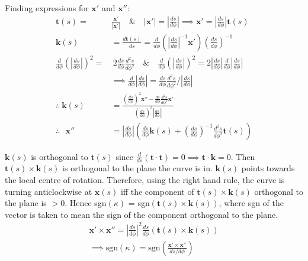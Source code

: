 \documentclass[12pt, a4paper]{article}
\begin{document}
Finding expressions for $\bm{x'}$ and $\bm{x''}$:
\begin{align}
	\bm{t}(s) = & \frac{\bm{x'}}{|\bm{x'}|} \text{ ~~\&~~ } |\bm{x'}| = \left\vert\frac{ds}{d\phi}\right\vert \implies \bm{x'} = \left\vert\frac{ds}{d\phi}\right\vert \bm{t}(s) \nonumber\\
	\bm{k}(s) & = \frac{d\bm{t}(s)}{ds}  = \frac{d}{d\phi}\left({\left\vert\frac{ds}{d\phi}\right\vert^{-1} \bm{x'}}\right)  \left(\frac{ds}{d\phi}\right)^{-1} \nonumber\\
	\frac{d}{d\phi}\left( \left\vert\frac{ds}{d\phi}\right\vert \right)^{2} = & ~ 2\frac{ds}{d\phi}\frac{d^{2}s}{d\phi^{2}} \text{ ~~\&~~ } \frac{d}{d\phi}\left( \left\vert\frac{ds}{d\phi}\right\vert \right)^{2} = 2\left\vert\frac{ds}{d\phi}\right\vert \frac{d}{d\phi}\left\vert\frac{ds}{d\phi}\right\vert \nonumber\\
	& \implies \frac{d}{d\phi}\left\vert\frac{ds}{d\phi}\right\vert = \frac{ds}{d\phi}\frac{d^{2}s}{d\phi^{2}} \bigg/ \left\vert\frac{ds}{d\phi}\right\vert \nonumber\\
	\therefore ~ \bm{k}(s) & = \frac{\left(\frac{ds}{d\phi}\right)^{2}\bm{x''} - \frac{ds}{d\phi} \frac{d^{2}s}{d\phi^{2}}\bm{x'}}{\left(\frac{ds}{d\phi}\right)^{3} \left\vert\frac{ds}{d\phi}\right\vert} \nonumber\\
	\therefore ~~~ \bm{x''} & = \left\vert\frac{ds}{d\phi}\right\vert \left(\frac{ds}{d\phi} \bm{k}(s) + \left(\frac{ds}{d\phi}\right)^{-1}  \frac{d^{2}s}{d\phi^{2}} \bm{t}(s)\right) \nonumber
\end{align}

$\bm{k}(s)$ is orthogonal to $\bm{t}(s)$ since $\frac{d}{ds}(\bm{t}\cdot\bm{t}) = 0 \implies \bm{t}\cdot\bm{k} = 0$. Then  $\bm{t}(s)\times\bm{k}(s)$ is orthogonal to the plane the curve is in. $\bm{k}(s)$ points towards the local centre of rotation. Therefore, using the right hand rule, the curve is turning anticlockwise at $\bm{x}(s)$ iff  the component of $\bm{t}(s)\times\bm{k}(s)$ orthogonal to the plane is $> 0$. Hence sgn$(\kappa)$ = sgn$(\bm{t}(s)\times\bm{k}(s))$, where sgn of the vector is taken to mean the sign of the component orthogonal to the plane.
\begin{align}
	\bm{x'}\times\bm{x''} = \left\vert\frac{ds}{d\phi}\right\vert^{2} \frac{ds}{d\phi} \left(\bm{t}(s)\times\bm{k}(s)\right) \nonumber\\
	\implies \text{sgn}(\kappa) = \text{sgn}\left(\frac{\bm{x'}\times\bm{x''}}{ds/d\phi}\right)	\nonumber
\end{align}
\end{document}
